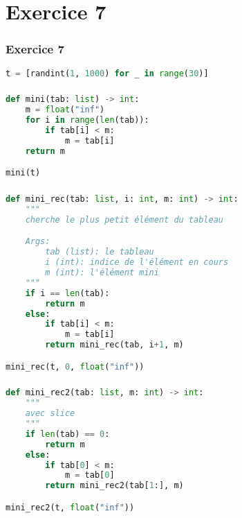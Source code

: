 \documentclass[svgnames,11pt]{beamer}
\begin{document}
\section{Exercice 7}
\begin{frame}[fragile]
    \frametitle{Exercice 7}

\begin{center}
\begin{lstlisting}[language=Python , basicstyle=\ttfamily\small, xleftmargin=2em, xrightmargin=2em]
t = [randint(1, 1000) for _ in range(30)]
\end{lstlisting}
\end{center}

\end{frame}
\begin{frame}[fragile]
    \frametitle{}

\begin{center}
\begin{lstlisting}[language=Python , basicstyle=\ttfamily\small, xleftmargin=2em, xrightmargin=2em]
def mini(tab: list) -> int:
    m = float("inf")
    for i in range(len(tab)):
        if tab[i] < m:
            m = tab[i]
    return m

mini(t)
\end{lstlisting}
\end{center}

\end{frame}
\begin{frame}[fragile]
    \frametitle{}

\begin{center}
\begin{lstlisting}[language=Python , basicstyle=\ttfamily\small, xleftmargin=1em, xrightmargin=1em]
def mini_rec(tab: list, i: int, m: int) -> int:
    """
    cherche le plus petit élément du tableau

    Args:
        tab (list): le tableau
        i (int): indice de l'élément en cours
        m (int): l'élément mini
    """
    if i == len(tab):
        return m
    else:
        if tab[i] < m:
            m = tab[i]
        return mini_rec(tab, i+1, m)

mini_rec(t, 0, float("inf"))
\end{lstlisting}
\end{center}

\end{frame}
\begin{frame}[fragile]
    \frametitle{}

\begin{center}
\begin{lstlisting}[language=Python , basicstyle=\ttfamily\small, xleftmargin=2em, xrightmargin=2em]
def mini_rec2(tab: list, m: int) -> int:
    """
    avec slice
    """
    if len(tab) == 0:
        return m
    else:
        if tab[0] < m:
            m = tab[0]
        return mini_rec2(tab[1:], m)

mini_rec2(t, float("inf"))
\end{lstlisting}
\label{CODE}
\end{center}

\end{frame}
\end{document}
